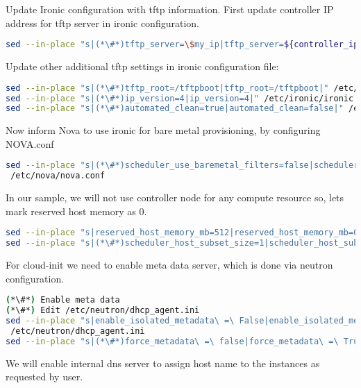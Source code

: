 Update Ironic configuration with tftp information. First update controller IP address for tftp server in ironic configuration.

\begin{lstlisting}[language=bash,keywords={}]
sed --in-place "s|(*\#*)tftp_server=\$my_ip|tftp_server=${controller_ip}|" /etc/ironic/ironic.conf
\end{lstlisting}

Update other additional tftp settings in ironic configuration file:


\begin{lstlisting}[language=bash,keywords={}]
sed --in-place "s|(*\#*)tftp_root=/tftpboot|tftp_root=/tftpboot|" /etc/ironic/ironic.conf
sed --in-place "s|(*\#*)ip_version=4|ip_version=4|" /etc/ironic/ironic.conf
sed --in-place "s|(*\#*)automated_clean=true|automated_clean=false|" /etc/ironic/ironic.conf
\end{lstlisting}

Now inform Nova to use ironic for bare metal provisioning, by configuring NOVA.conf

\begin{lstlisting}[language=bash,keywords={}]
sed --in-place "s|(*\#*)scheduler_use_baremetal_filters=false|scheduler_use_baremetal_filters=true|" \
 /etc/nova/nova.conf
\end{lstlisting}

In our sample, we will not use controller node for any compute resource so, lets mark reserved host memory as 0.

\begin{lstlisting}[language=bash,keywords={}]
sed --in-place "s|reserved_host_memory_mb=512|reserved_host_memory_mb=0|" /etc/nova/nova.conf
sed --in-place "s|(*\#*)scheduler_host_subset_size=1|scheduler_host_subset_size=9999999|" /etc/nova/nova.conf
\end{lstlisting}

For cloud-init we need to enable meta data server, which is done via neutron configuration.

\begin{lstlisting}[language=bash,keywords={}]
(*\#*) Enable meta data
(*\#*) Edit /etc/neutron/dhcp_agent.ini
sed --in-place "s|enable_isolated_metadata\ =\ False|enable_isolated_metadata\ =\ True|" \
 /etc/neutron/dhcp_agent.ini
sed --in-place "s|(*\#*)force_metadata\ =\ false|force_metadata\ =\ True|" \ /etc/neutron/dhcp_agent.ini
\end{lstlisting}

We will enable internal dns server to assign host name to the instances as requested by user. 


